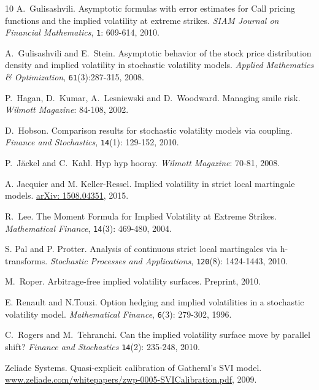\documentclass{amsart}[11pt]
\numberwithin{equation}{section}
\theoremstyle{definition}
\begin{document}
\begin{thebibliography}{10}
A.~Gulisashvili.
Asymptotic formulas with error estimates for Call pricing functions and the implied volatility at extreme strikes.
\textit{SIAM Journal on Financial Mathematics}, {\tt 1}: 609-614, 2010.

A.~Gulisashvili and E.~Stein. 
Asymptotic behavior of the stock price distribution density and implied volatility in stochastic volatility models.
\textit{Applied Mathematics \& Optimization}, {\tt 61}(3):287-315, 2008.

P.~Hagan, D.~Kumar, A.~Lesniewski and D.~Woodward.
Managing smile risk.
\textit{Wilmott Magazine}: 84-108, 2002.

D.~Hobson.
Comparison results for stochastic volatility models via coupling. 
\textit{Finance and Stochastics}, {\tt 14}(1): 129-152, 2010.

P.~J\"ackel and C.~Kahl.
Hyp hyp hooray.
\textit{Wilmott Magazine}: 70-81, 2008.

A. Jacquier and M. Keller-Ressel.
Implied volatility in strict local martingale models.
\href{http://arxiv.org/abs/1508.04351}{arXiv: 1508.04351}, 2015.

R.~Lee.
The Moment Formula for Implied Volatility at Extreme Strikes.
\textit{Mathematical Finance}, {\tt 14}(3): 469-480, 2004.

S. Pal and P. Protter.
Analysis of continuous strict local martingales via h-transforms.
\textit{Stochastic Processes and Applications}, {\tt 120}(8): 1424-1443, 2010.

M.~Roper.
Arbitrage-free implied volatility surfaces.
Preprint, 2010.

E. Renault and N.Touzi.
Option hedging and implied volatilities in a stochastic volatility model.
\textit{Mathematical Finance}, {\tt 6}(3): 279-302, 1996.

C.~Rogers and M.~Tehranchi.
Can the implied volatility surface move by parallel shift?
\textit{Finance and Stochastics} {\tt 14}(2): 235-248, 2010.

Zeliade Systems.
Quasi-explicit calibration of Gatheral's SVI model.
\href{http://www.zeliade.com/whitepapers/zwp-0005-SVICalibration.pdf}{www.zeliade.com/whitepapers/zwp-0005-SVICalibration.pdf}, 2009.

\end{thebibliography}
\end{document}
